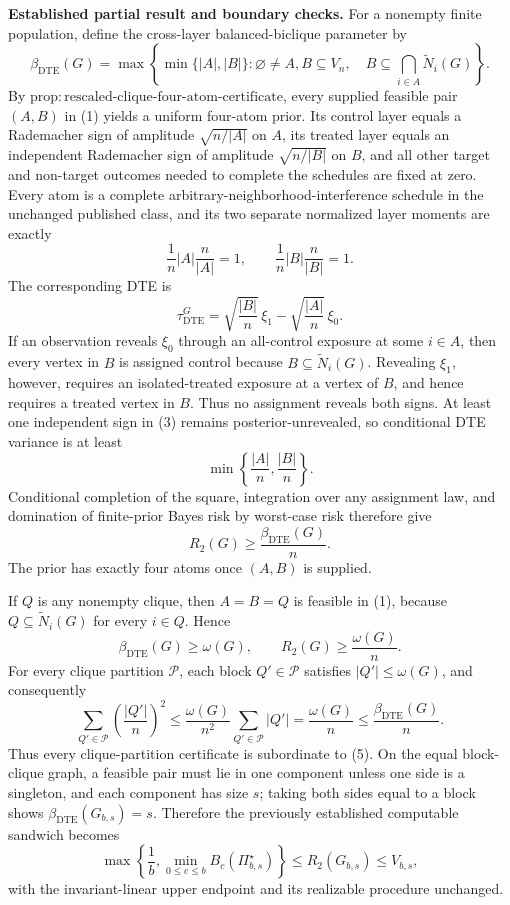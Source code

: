 \textbf{Established partial result and boundary checks.}
For a nonempty finite population, define the cross-layer balanced-biclique parameter by
\[
\beta_{\mathrm{DTE}}(G)
=
\max\left\{
\min\{|A|,|B|\}:
\varnothing\ne A,B\subseteq V_n,
\quad
B\subseteq\bigcap_{i\in A}\widetilde N_i(G)
\right\}.
\tag{1}
\]
By \(\mathrm{prop{:}rescaled\text{-}clique\text{-}four\text{-}atom\text{-}certificate}\), every supplied feasible pair \((A,B)\) in (1) yields a uniform four-atom prior.  Its control layer equals a Rademacher sign of amplitude \(\sqrt{n/|A|}\) on \(A\), its treated layer equals an independent Rademacher sign of amplitude \(\sqrt{n/|B|}\) on \(B\), and all other target and non-target outcomes needed to complete the schedules are fixed at zero.  Every atom is a complete arbitrary-neighborhood-interference schedule in the unchanged published class, and its two separate normalized layer moments are exactly
\[
\frac1n|A|\frac n{|A|}=1,
\qquad
\frac1n|B|\frac n{|B|}=1.
\tag{2}
\]
The corresponding DTE is
\[
\tau_{\mathrm{DTE}}^G
=
\sqrt{\frac{|B|}{n}}\,\xi_1
-
\sqrt{\frac{|A|}{n}}\,\xi_0.
\tag{3}
\]
If an observation reveals \(\xi_0\) through an all-control exposure at some \(i\in A\), then every vertex in \(B\) is assigned control because \(B\subseteq\widetilde N_i(G)\).  Revealing \(\xi_1\), however, requires an isolated-treated exposure at a vertex of \(B\), and hence requires a treated vertex in \(B\).  Thus no assignment reveals both signs.  At least one independent sign in (3) remains posterior-unrevealed, so conditional DTE variance is at least
\[
\min\left\{\frac{|A|}{n},\frac{|B|}{n}\right\}.
\tag{4}
\]
Conditional completion of the square, integration over any assignment law, and domination of finite-prior Bayes risk by worst-case risk therefore give
\[
R_2(G)\geq\frac{\beta_{\mathrm{DTE}}(G)}n.
\tag{5}
\]
The prior has exactly four atoms once \((A,B)\) is supplied.

If \(Q\) is any nonempty clique, then \(A=B=Q\) is feasible in (1), because \(Q\subseteq\widetilde N_i(G)\) for every \(i\in Q\).  Hence
\[
\beta_{\mathrm{DTE}}(G)\geq\omega(G),
\qquad
R_2(G)\geq\frac{\omega(G)}n.
\tag{6}
\]
For every clique partition \(\mathcal P\), each block \(Q'\in\mathcal P\) satisfies \(|Q'|\leq\omega(G)\), and consequently
\[
\sum_{Q'\in\mathcal P}\left(\frac{|Q'|}{n}\right)^2
\leq
\frac{\omega(G)}{n^2}\sum_{Q'\in\mathcal P}|Q'|
=\frac{\omega(G)}n
\leq\frac{\beta_{\mathrm{DTE}}(G)}n.
\tag{7}
\]
Thus every clique-partition certificate is subordinate to (5).  On the equal block-clique graph, a feasible pair must lie in one component unless one side is a singleton, and each component has size \(s\); taking both sides equal to a block shows \(\beta_{\mathrm{DTE}}(G_{b,s})=s\).  Therefore the previously established computable sandwich becomes
\[
\max\left\{
\frac1b,
\min_{0\leq c\leq b}B_c(\Pi_{b,s}^{\star})
\right\}
\leq R_2(G_{b,s})\leq V_{b,s},
\tag{8}
\]
with the invariant-linear upper endpoint and its realizable procedure unchanged.

